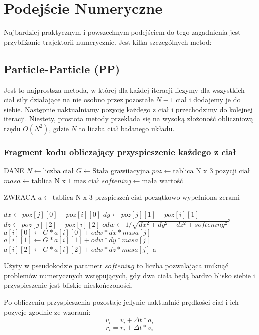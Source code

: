 \documentclass{article}
\begin{document}
\clearpage
\section{Podejście Numeryczne}
Najbardziej praktycznym i powszechnym podejściem do tego zagadnienia jest przybliżanie trajektorii numerycznie. Jest kilka szczególnych metod:\\
\subsection*{Particle-Particle (PP)}
Jest to najprostsza metoda, w której dla każdej iteracji liczymy dla wszystkich ciał siły działające na nie osobno przez pozostałe $N-1$ ciał i dodajemy je do siebie. Następnie uaktualniamy pozycję każdego z ciał i przechodzimy do kolejnej iteracji. Niestety, prostota metody przekłada się na wysoką złożoność obliczniową rzędu $O(N^2)$, gdzie $N$ to liczba ciał badanego układu.

\subsubsection*{Fragment kodu obliczający przyspieszenie każdego z ciał}
\begin{algorithmic}
\STATE DANE
 \STATE $N\gets \text{liczba ciał}$
 \STATE $G\gets \text{Stała grawitacyjna}$
 \STATE $poz\gets \text{tablica N x 3 pozycji ciał}$
 \STATE $masa\gets \text{tablica N x 1 mas ciał}$
 \STATE $softening\gets \text{mała wartość}$
 
 \STATE ZWRACA
 \STATE $a\gets \text{tablica N x 3 przspieszeń ciał początkowo wypełniona zerami}$
 
            \STATE $dx\gets poz[j][0]-poz[i][0]$
            \STATE $dy\gets poz[j][1]-poz[i][1]$
            \STATE $dz\gets poz[j][2]-poz[i][2]$
            \STATE $odw\gets 1/\sqrt{dx^2+dy^2+dz^2+softening^2}^3$
            \STATE $a[i][0]\gets G*a[i][0]+odw*dx*masa[j]$
            \STATE $a[i][1]\gets G*a[i][1]+odw*dy*masa[j]$
            \STATE $a[i][2]\gets G*a[i][2]+odw*dz*masa[j]$
        \ENDIF
      \ENDFOR
  \ENDFOR
 \RETURN a
\end{algorithmic}

Użyty w pseudokodzie parametr $softening$ to liczba pozwalająca uniknąć problemów numerycznych wstępujących, gdy dwa ciała będą bardzo blisko siebie i przyspieszenie jest bliskie nieskończoności.

Po obliczeniu przyspieszenia pozostaje jedynie uaktualnić prędkości ciał i ich pozycje zgodnie ze wzorami:
$$v_i=v_i+\Delta t * a_i$$
$$r_i=r_i+\Delta t * v_i$$
\end{document}
